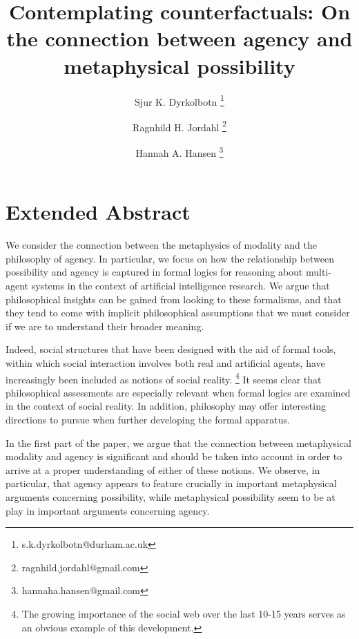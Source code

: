 \documentclass{article}
\begin{document}
\title{Contemplating counterfactuals: On the connection between agency and metaphysical possibility}
\author[1]{Sjur K. Dyrkolbotn \thanks{s.k.dyrkolbotn@durham.ac.uk}}
\author[2]{Ragnhild H. Jordahl \thanks{ragnhild.jordahl@gmail.com}}
\author[3]{Hannah A. Hansen \thanks{hannaha.hansen@gmail.com}}

\date{}
\maketitle

\section*{Extended Abstract}

We consider the connection between the metaphysics of modality and the philosophy of agency.
In particular, we focus on how the relationship between possibility and agency is captured in formal logics for  reasoning about multi-agent systems in the context of artificial intelligence research. We argue that philosophical insights can be gained from looking to these formalisms, and that they tend to come with implicit philosophical assumptions that we must consider if we are to understand their broader meaning.

Indeed, social structures that have been designed with the aid of formal tools, within which social interaction involves both real and artificial agents, have increasingly been included as notions of social reality. \footnote{The growing importance of the social web over the last 10-15 years serves as an obvious example of this development.} It seems clear that philosophical assessments are especially relevant when formal logics are examined in the context of social reality. In addition, philosophy may offer interesting directions to pursue when further developing the formal apparatus.

In the first part of the paper, we argue that the connection between metaphysical modality and agency is significant and should be taken into account in order to arrive at a proper understanding of either of these notions. We observe, in particular, that agency appears to feature crucially in important metaphysical arguments concerning possibility, while metaphysical possibility seem to be at play in important arguments concerning agency. 
\end{document}
